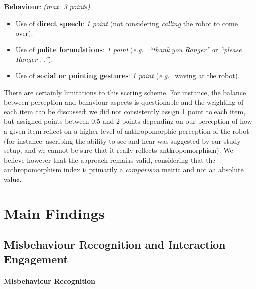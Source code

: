 \documentclass{sig-alternate}
\newcommand{\eg}{{\textit{e.g.~}}}
\begin{document}
\textbf{Behaviour}: \textit{(max. 3 points)}
\begin{itemize}
    \item Use of \textbf{direct speech}: \textit{1 point} (not considering
        \textit{calling} the robot to come over).

    \item Use of \textbf{polite formulations}: \textit{1 point} (\eg
        \textit{``thank you Ranger''} or \textit{``please Ranger ...''}).

    \item Use of \textbf{social or pointing gestures}: \textit{1 point} (\eg
        waving at the robot).

\end{itemize}

There are certainly limitations to this scoring scheme. For instance, the
balance between perception and behaviour aspects is questionable and the
weighting of each item can be discussed: we did not consistently assign 1 point
to each item, but assigned points between 0.5 and 2 points depending on our
perception of how a given item reflect on a higher level of anthropomorphic
perception of the robot (for instance, ascribing the ability to see and hear was
suggested by our study setup, and we cannot be sure that it really reflects
anthropomorphism). We believe however that the approach remains valid,
considering that the anthropomorphism index is primarily a \emph{comparison}
metric and not an absolute value.

\section{Main Findings}

\subsection{Misbehaviour Recognition and Interaction Engagement}

\paragraph{Misbehaviour Recognition}
\end{document}
